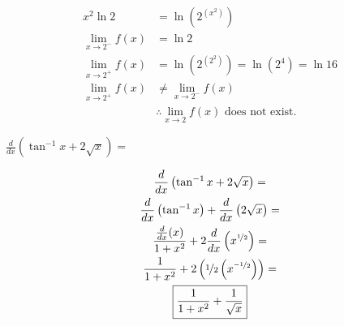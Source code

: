 \documentclass[12pt,letterpaper, onecolumn]{exam}
\begin{document}
\begin{questions}
\begin{solution}
            \begin{align*}
		x^2 \ln 2		 &= \ln ( 2 ^  {(x ^ 2)} ) \\
		\lim_{x\to2^-} f(x)  &=  \ln 2 \\ %
		\lim_{x\to2^+} f(x) &= \ln (2^{(2^2)}) = \ln (2^4) = \ln 16 \\ %
		\lim_{x\to2^+} f(x) & \neq \lim_{x\to2^-} f(x) \\ %
					 & \therefore \boxed{\lim_{x\to2} f(x) \text{ does not exist.}}
	\end{align*}
    \end{solution}
 

\pagebreak

\question $\frac{d}{dx} ( \tan^{-1} x + 2 \sqrt{x} ) = $	


    \begin{solution}
          \begin{gather*}
		\frac{d}{dx} \left( \tan^{-1} x + 2 \sqrt{x} \right)  = \\ 
		\frac{d}{dx} \left( \tan^{-1} x \right) + \frac{d}{dx} \left( 2 \sqrt{x} \right) = \\
		\frac{\frac{d}{dx}(x)}{1+x^2} + 2 \frac{d}{dx} \left( x^{\nicefrac{1}{2}} \right) = \\
		\frac{1}{1+x^2} + 2 \left(\nicefrac{1}{2}\left(x^{\nicefrac{-1}{2}}\right)\right) = \\
		\boxed{\frac{1}{1+x^2} + \frac{1}{\sqrt{x}}}
	\end{gather*}
    \end{solution}
    

\end{questions}
\end{document}
